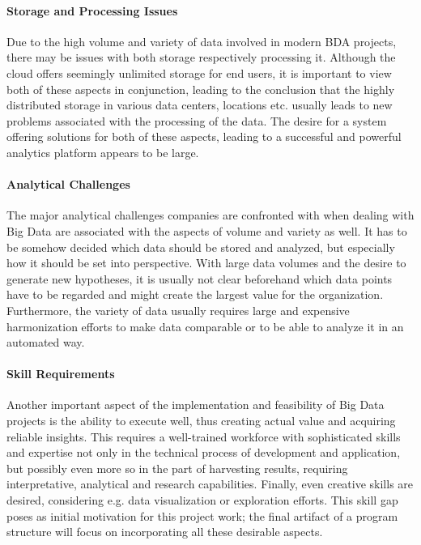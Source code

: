 \paragraph{Storage and Processing Issues}
Due to the high volume and variety of data involved in modern \ac{BDA} projects, there may be issues with both storage respectively processing it. Although the cloud offers seemingly unlimited storage for end users, it is important to view both of these aspects in conjunction, leading to the conclusion that the highly distributed storage in various data centers, locations etc. usually leads to new problems associated with the processing of the data. The desire for a system offering solutions for both of these aspects, leading to a successful and powerful analytics platform appears to be large.

\paragraph{Analytical Challenges}
The major analytical challenges companies are confronted with when dealing with Big Data are associated with the aspects of volume and variety as well. It has to be somehow decided which data should be stored and analyzed, but especially how it should be set into perspective. With large data volumes and the desire to generate new hypotheses, it is usually not clear beforehand which data points have to be regarded and might create the largest value for the organization. Furthermore, the variety of data usually requires large and expensive harmonization efforts to make data comparable or to be able to analyze it in an automated way. 

\paragraph{Skill Requirements}
Another important aspect of the implementation and feasibility of Big Data projects is the ability to execute well, thus creating actual value and acquiring reliable insights. This requires a well-trained workforce with sophisticated skills and expertise not only in the technical process of development and application, but possibly even more so in the part of harvesting results, requiring interpretative, analytical and research capabilities. Finally, even creative skills are desired, considering e.g. data visualization or exploration efforts. This skill gap poses as initial motivation for this project work; the final artifact of a program structure will focus on incorporating all these desirable aspects.

